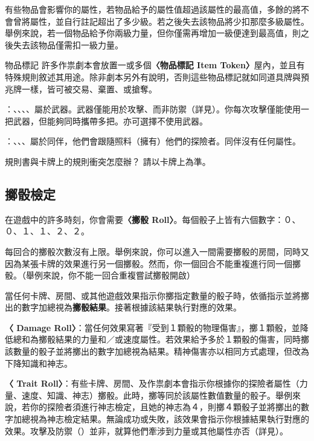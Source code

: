 有些物品會影響你的屬性，若物品給予的屬性值超過該屬性的最高值，多餘的將不會曾將屬性，並自行註記超出了多少級。若之後失去該物品將少扣那麼多級屬性。舉例來說，若一個物品給予你兩級力量，但你僅需再增加一級便達到最高值，則之後失去該物品僅需扣一級力量。

\begin{RuleBox}{物品標記}
	許多作祟劇本會放置一或多個\textbf{〈物品標記 Item Token〉}屋內，並且有特殊規則敘述其用途。除非劇本另外有說明，否則這些物品標記就如同道具牌與預兆牌一樣，皆可被交易、棄置、或搶奪。
\end{RuleBox}

\textbf{}：、、、、屬於武器。武器僅能用於攻擊、而非防禦（詳見）。你每次攻擊僅能使用一把武器，但能夠同時攜帶多把。亦可選擇不使用武器。

\textbf{}：、、、屬於同伴，他們會跟隨照料（擁有）他們的探險者。同伴沒有任何屬性。

\begin{RuleBox}{規則書與卡牌上的規則衝突怎麼辦？}
	請以卡牌上為準。
\end{RuleBox}


\subsection{擲骰檢定} \label{ssec:attempt-a-die-roll}

在遊戲中的許多時刻，你會需要\textbf{〈擲骰 Roll〉}。每個骰子上皆有六個數字：０、０、１、１、２、２。

每回合的擲骰次數沒有上限。舉例來說，你可以進入一間需要擲骰的房間，同時又因為某張卡牌的效果進行另一個擲骰。然而，你一個回合不能重複進行同一個擲骰。（舉例來說，你不能一回合重複嘗試擲骰開啟）

當任何卡牌、房間、或其他遊戲效果指示你擲指定數量的骰子時，依循指示並將擲出的數字加總視為\textbf{擲骰結果}。接著根據該結果執行對應的效果。

\textbf{〈 Damage Roll〉}：當任何效果寫著『受到１顆骰的物理傷害』，擲１顆骰，並降低總和為擲骰結果的力量和／或速度屬性。若效果給予多於１顆骰的傷害，同時擲該數量的骰子並將擲出的數字加總視為結果。精神傷害亦以相同方式處理，但改為下降知識和神志。

\textbf{〈 Trait Roll〉}：有些卡牌、房間、及作祟劇本會指示你根據你的探險者屬性（力量、速度、知識、神志）擲骰。此時，擲等同於該屬性數值數量的骰子。舉例來說，若你的探險者須進行神志檢定，且她的神志為４，則擲４顆骰子並將擲出的數字加總視為神志檢定結果。無論成功或失敗，該效果會指示你根據結果執行對應的效果。攻擊及防禦（）並非，就算他們牽涉到力量或其他屬性亦否（詳見）。

